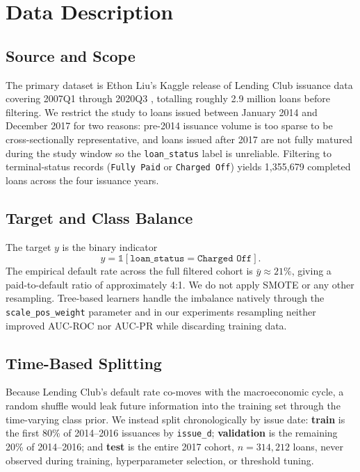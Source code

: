 \documentclass[conference]{IEEEtran}
\begin{document}
\section{Data Description}

\subsection{Source and Scope}

The primary dataset is Ethon Liu's Kaggle release of Lending Club issuance
data covering 2007Q1 through 2020Q3 \cite{lendingclub_kaggle}, totalling
roughly 2.9 million loans before filtering. We restrict the study to loans
issued between January 2014 and December 2017 for two reasons: pre-2014
issuance volume is too sparse to be cross-sectionally representative, and
loans issued after 2017 are not fully matured during the study window so the
\texttt{loan\_status} label is unreliable. Filtering to terminal-status
records (\texttt{Fully Paid} or \texttt{Charged Off}) yields 1{,}355{,}679
completed loans across the four issuance years.

\subsection{Target and Class Balance}

The target $y$ is the binary indicator
\[
y = \mathbb{1}[\texttt{loan\_status} = \texttt{Charged Off}].
\]
The empirical default rate across the full filtered cohort is
$\bar{y} \approx 21\%$, giving a paid-to-default ratio of approximately 4:1.
We do not apply SMOTE or any other resampling. Tree-based learners handle
the imbalance natively through the \texttt{scale\_pos\_weight} parameter and
in our experiments resampling neither improved AUC-ROC nor AUC-PR while
discarding training data.

\subsection{Time-Based Splitting}

Because Lending Club's default rate co-moves with the macroeconomic cycle, a
random shuffle would leak future information into the training set through
the time-varying class prior. We instead split chronologically by issue date:
\textbf{train} is the first 80\% of 2014--2016 issuances by
\texttt{issue\_d}; \textbf{validation} is the remaining 20\% of 2014--2016;
and \textbf{test} is the entire 2017 cohort, $n = 314{,}212$ loans, never
observed during training, hyperparameter selection, or threshold tuning.
\end{document}
